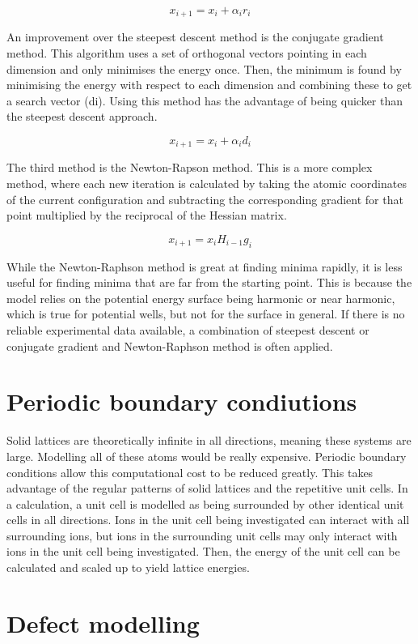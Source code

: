 \documentclass[10pt,a4paper, titlepage]{article}
\begin{document}
$$ x_{i+1} = x_i + \alpha_i r_i $$

An improvement over the steepest descent method is the conjugate gradient method. 
This algorithm uses a set of orthogonal vectors pointing in each dimension and only minimises the energy once. 
Then, the minimum is found by minimising the energy with respect to each dimension and combining these to get a search vector (di). 
Using this method has the advantage of being quicker than the steepest descent approach. 

$$ x_{i+1} = x_i + \alpha_i d_i $$

The third method is the Newton-Rapson method. 
This is a more complex method, where each new iteration is calculated by taking the atomic coordinates of the current configuration and subtracting the corresponding gradient for that point multiplied by the reciprocal of the Hessian matrix. 

$$ x_{i+1} = x_i H_{i-1}g_i $$

While the Newton-Raphson method is great at finding minima rapidly, it is less useful for finding minima that are far from the starting point. 
This is because the model relies on the potential energy surface being harmonic or near harmonic, which is true for potential wells, but not for the surface in general. 
If there is no reliable experimental data available, a combination of steepest descent or conjugate gradient and Newton-Raphson method is often applied. 

\section{Periodic boundary condiutions}

Solid lattices are theoretically infinite in all directions, meaning these systems are large. 
Modelling all of these atoms would be really expensive. Periodic boundary conditions allow this computational cost to be reduced greatly. 
This takes advantage of the regular patterns of solid lattices and the repetitive unit cells. 
In a calculation, a unit cell is modelled as being surrounded by other identical unit cells in all directions. 
Ions in the unit cell being investigated can interact with all surrounding ions, but ions in the surrounding unit cells may only interact with ions in the unit cell being investigated. 
Then, the energy of the unit cell can be calculated and scaled up to yield lattice energies. 

\section{Defect modelling}
\end{document}
